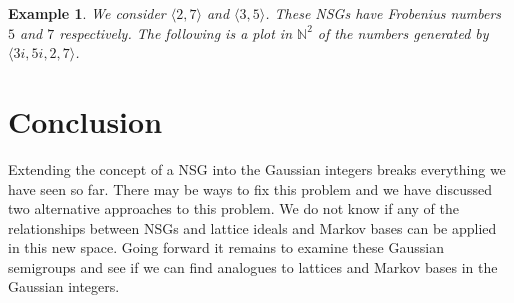 \documentclass[11pt]{amsart}
\theoremstyle{plain}
\newtheorem{exa}{Example}
\theoremstyle{definition}
\begin{document}
\begin{exa}
We consider $\langle 2,7\rangle$ and $\langle 3,5\rangle$. These NSGs have Frobenius numbers $5$ and $7$ respectively\cite{frobmask}. The following is a plot in $\mathbb{N}^2$ of the numbers generated by $\langle 3i,5i,2,7\rangle$.

\begin{center}
\end{center}
\end{exa}
\section{Conclusion}
Extending the concept of a NSG into the Gaussian integers breaks everything we have seen so far. There may be ways to fix this problem and we have discussed two alternative approaches to this problem. We do not know if any of the relationships between NSGs and lattice ideals and Markov bases can be applied in this new space. Going forward it remains to examine these Gaussian semigroups and see if we can find analogues to lattices and Markov bases in the Gaussian integers.


\end{document}

